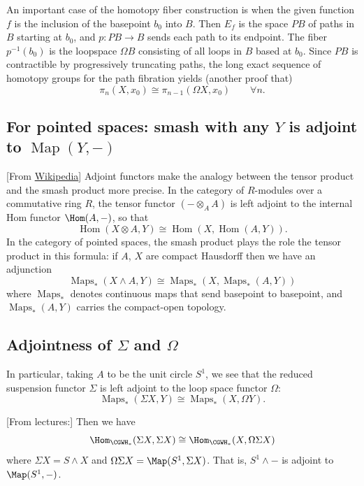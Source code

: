 \begin{remark}
\begin{defn}
	An important case of the homotopy fiber construction is when the given function $f$ is the inclusion of the basepoint $b_0$ into $B$. Then $E_{f}$ is the space $PB$ of paths in $B$ starting at $b_{0}$,  and $p:PB\to B$ sends each path to its endpoint. The fiber $p^{-1}(b_{0})$ is the loopspace $\Omega B$ consisting of all loops in  $B$ based at $b_{0}$. Since $PB$ is contractible by progressively truncating paths, the long exact sequence of homotopy groups for the path fibration yields (another proof that)
	\[\pi_{n}(X,x_{0})\cong \pi_{n-1}(\Omega X,x_{0})\qquad \forall n.\]
\end{defn}

\subsection{For pointed spaces: smash with any \texorpdfstring{$Y$}{Y}		 is adjoint to  \texorpdfstring{$\operatorname{Map}(Y,-)$}{Map(Y,-)}}
[From \href{https://en.wikipedia.org/wiki/Smash_product#}{Wikipedia}]
Adjoint functors make the analogy between the tensor product and the smash product more precise. In the category of $R$-modules over a commutative ring $R$, the tensor functor $(-\otimes_{A} A)$ is left adjoint to the internal Hom functor $\Hom(A,-)$, so that
\[\operatorname{Hom}(X\otimes A,Y)\cong \operatorname{Hom}(X,\operatorname{Hom}(A,Y)).\]
In the category of pointed spaces, the smash product plays the role the tensor product in this formula: if $A$, $X$ are compact Hausdorff then we have an adjunction
\[\operatorname{Maps}_{*}(X\wedge A,Y)\cong \operatorname{Maps}_{*}(X,\operatorname{Maps}_{*}(A,Y))\]
where $\operatorname{Maps}_{*}$ denotes continuous maps that send basepoint to basepoint, and $\operatorname{Maps}_{*}(A,Y)$ carries the compact-open topology.

\subsection{Adjointness of \texorpdfstring{$\Sigma$}{Σ} and \texorpdfstring{$\Omega$}{Ω}}
In particular, taking $A$ to be the unit circle $S^{1}$, we see that the reduced suspension functor $\Sigma$ is left adjoint to the loop space functor $\Omega$:
\[\operatorname{Maps}_{*}(\Sigma X,Y)\cong \operatorname{Maps}_{*}(X,\Omega Y).\]

[From lectures:] Then we have
\[\Hom_{\CGWH_*}(\Sigma X,\Sigma X)\cong\Hom_{\CGWH_*}(X,\Omega\Sigma X)\]
where $\Sigma X=S\wedge X$ and $\Omega\Sigma X=\Map(S^1,\Sigma X)$. That is, $S^1\wedge-$ is adjoint to $\Map(S^1,-)$.


\end{remark}
